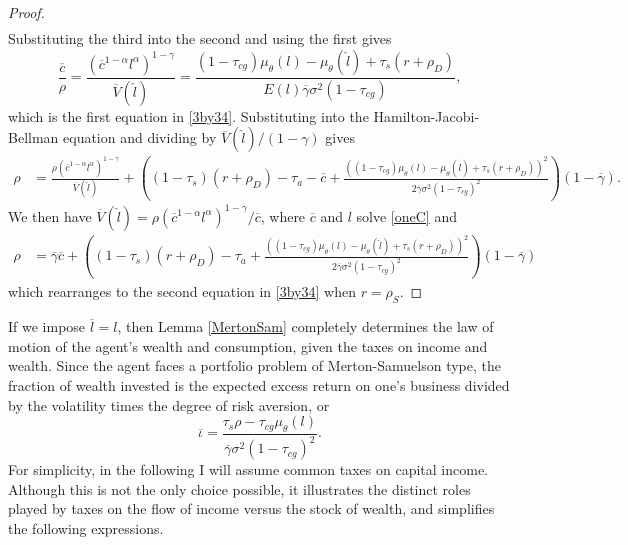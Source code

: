\documentclass[11pt]{article}
\theoremstyle{plain}
\begin{document}
\begin{proof}
\begin{align*}
\end{align*}
Substituting the third into the second and using the first gives 
\begin{equation}
\frac{\overline{c}}{\rho} = \frac{(\overline{c}^{1-\alpha}l^{\alpha})^{1-\gamma}}{\overline{V}(\hat{l})} = \frac{(1 - \tau_{cg})\mu_{\theta}(l) - \mu_{\theta}(\hat{l}) + \tau_s(r + \rho_D)}{E(l)\overline{\gamma}\sigma^2(1-\tau_{cg})},
\label{oneC}
\end{equation}
which is the first equation in \eqref{3by34}. Substituting into the Hamilton-Jacobi-Bellman equation and dividing by $\overline{V}(\hat{l})/(1-\gamma)$ gives
\begin{align*}
\rho & = \frac{\rho(\overline{c}^{1-\alpha}l^{\alpha})^{1-\gamma}}{\overline{V}(\hat{l})} +  {\left((1-\tau_s)(r + \rho_D) - \tau_a - \overline{c} 
 + \frac{((1 - \tau_{cg})\mu_{\theta}(l) - \mu_{\theta}(\hat{l}) + \tau_s(r + \rho_D))^2}{2\overline{\gamma}\sigma^2(1-\tau_{cg})^2}\right)}(1-\overline{\gamma}).
\end{align*}
We then have $\overline{V}(\hat{l}) = \rho(\overline{c}^{1-\alpha}l^{\alpha})^{1-\gamma}/\overline{c}$, where $\overline{c}$ and $l$ solve \eqref{oneC} and
\begin{align*}
\rho & = \overline{\gamma}\overline{c} + {\left((1-\tau_s)(r+\rho_D) - \tau_a + \frac{((1-\tau_{cg})\mu_{\theta}(l) - \mu_{\theta}(\hat{l}) + \tau_s(r + \rho_D))^2}{2\overline{\gamma}\sigma^2(1-\tau_{cg})^2}\right)} (1-\overline{\gamma})
\end{align*}
which rearranges to the second equation in \eqref{3by34} when $r = \rho_S$. 
\end{proof}


If we impose $\overline{l} = l$, then Lemma \ref{MertonSam} completely determines the law of motion of the agent's wealth and consumption, given the taxes on income and wealth. Since the agent faces a portfolio problem of Merton-Samuelson type, the fraction of wealth invested is the expected excess return on one's business divided by the volatility times the degree of risk aversion, or
\begin{equation}
\overline{\iota} = \frac{\tau_s\rho - \tau_{cg}\mu_{\theta}(l)}{\overline{\gamma}\sigma^2(1-\tau_{cg})^2}.
\label{invest}
\end{equation} 
For simplicity, in the following I will assume common taxes on capital income. Although this is not the only choice possible, it illustrates the distinct roles played by taxes on the flow of income versus the stock of wealth, and simplifies the following expressions.
\end{document}
